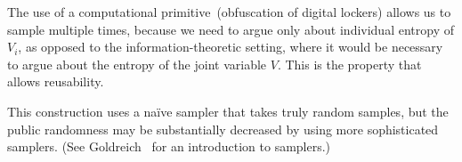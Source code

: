 \documentclass[11pt]{article}
\newcommand{\consref}[1]{\mbox{Construction~\ref{#1}}}
\newcommand{\Huse}{\mathrm{H}_{\mathtt{usable}}}
\begin{document}
\noindent
The use of a computational primitive~(obfuscation of digital lockers) allows us to sample multiple times, because we need to argue only about individual entropy of $V_i$, as opposed to the information-theoretic setting, where it would be necessary to argue about the entropy of the joint variable $V$.  This is the property that allows reusability.

This construction uses a na\"{i}ve sampler that takes truly random samples, but the public randomness may be substantially decreased by using more sophisticated samplers. (See Goldreich~\cite{goldreich2011sample} for an introduction to samplers.)
\end{document}
